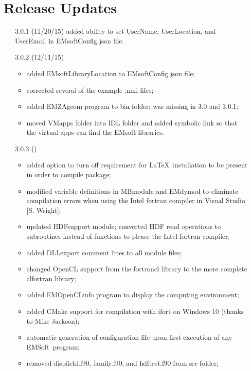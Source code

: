 \documentclass[DIV=calc, paper=letter, fontsize=11pt]{scrartcl}	 %
\newcommand{\ctp}{\textsf{EMSoft}}
\begin{document}
\newpage
\section{Release Updates}
\begin{itemize}
	\item[3.0.1] (11/20/15) added ability to set UserName, UserLocation, and UserEmail in \textsf{EMsoftConfig.json} file.
	\item[3.0.2] (12/11/15) \begin{itemize}
		\item added EMsoftLibraryLocation to \textsf{EMsoftConfig.json} file;
		\item corrected several of the example .nml files;
		\item added EMZAgeom program to bin folder; was missing in 3.0 and 3.0.1;
		\item moved VMapps folder into IDL folder and added symbolic link so that the virtual apps can find the EMsoft libraries.
	\end{itemize}
        \item[3.0.3] () \begin{itemize}
                \item added option to turn off requirement for \LaTeX\ installation to be present in order to compile package;
                \item modified variable definitions in MBmodule and EMdymod to eliminate compilation errors when using the Intel fortran 
                compiler in Visual Studio [S. Wright]; 
                \item updated \textsf{HDFsupport} module; converted HDF read operations to subroutines instead of functions to please the Intel fortran 
                compiler;
                \item added DLLexport comment lines to all module files;
                \item changed OpenCL support from the \textsf{fortrancl} library to the more complete \textsf{clfortran} library;
                \item added \textsf{EMOpenCLinfo} program to display the computing environment;
                \item added CMake support for compilation with ifort on Windows 10 (thanks to Mike Jackson);
                \item automatic generation of configuration file upon first execution of any \ctp\ program;
                \item removed dispfield.f90, family.f90, and hdftest.f90 from src folder;
        \end{itemize}
\end{itemize}
\end{document}
